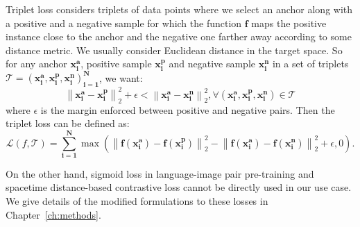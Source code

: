 Triplet loss considers triplets of data points where we select an anchor along with a positive and a negative sample for which the function $\mathbf{f}$ maps the positive instance close to the anchor and the negative one farther away according to some distance metric. We usually consider Euclidean distance in the target space. So for any anchor $\mathbf{x^a_i}$, positive sample $\mathbf{x^p_i}$ and negative sample $\mathbf{x^n_i}$ in a set of triplets $\mathcal{T} = \mathbf{\left(x_{i}^{a}, x_{i}^{p}, x_{i}^{n}\right)_{i=1}^N}$, we want:
\begin{equation}
    \left\|\mathbf{x_{i}^{a}-x_{i}^{p}}\right\|_{2}^{2}+\epsilon<\left\|\mathbf{x_{i}^{a}-x_{i}^{n}}\right\|_{2}^{2}, \forall\left(\mathbf{x_{i}^{a}, x_{i}^{p}, x_{i}^{n}}\right) \in \mathcal{T} 
\end{equation}
where $\epsilon$ is the margin enforced between positive and negative pairs. Then the triplet loss can be defined as:
\begin{equation}
    \mathcal{L}(f, \mathcal{T}) = \sum_{\mathbf{i=1}}^\mathbf{N} \max \left(\left\|\mathbf{f(x_{i}^{a})-f(x_{i}^{p})}\right\|_{2}^{2} - \left\|\mathbf{f(x_{i}^{a})-f(x_{i}^{n})}\right\|_{2}^{2} +\epsilon, 0\right) .
\end{equation}
\newline

On the other hand, sigmoid loss in language-image pair pre-training and spacetime distance-based contrastive loss cannot be directly used in our use case. We give details of the modified formulations to these losses in Chapter~\ref{ch:methods}.